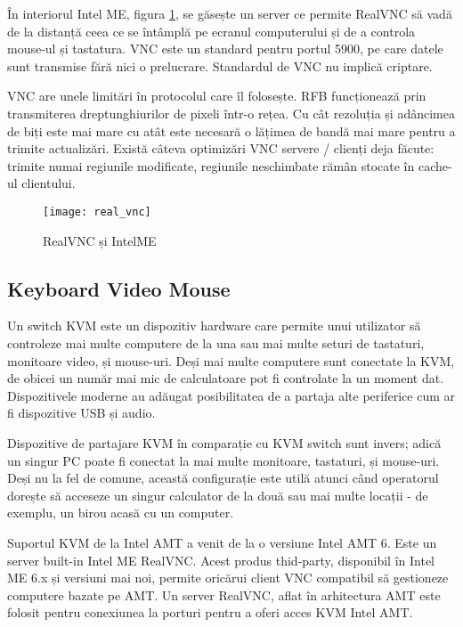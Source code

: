 În interiorul Intel ME, figura \ref{real-vnc}, se găsește un server ce permite RealVNC să vadă de la distanță ceea ce se întâmplă pe ecranul computerului și de a controla mouse-ul și tastatura. VNC este un standard pentru portul 5900, pe care datele sunt transmise fără nici o prelucrare. Standardul de VNC nu implică criptare. 

VNC are unele limitări în protocolul care îl folosește. RFB funcționează prin transmiterea dreptunghiurilor de pixeli într-o rețea. Cu cât rezoluția și adâncimea de biți este mai mare cu atât este necesară o lățimea de bandă mai mare pentru a trimite actualizări. Există câteva optimizări VNC servere / clienți deja făcute: trimite numai regiunile modificate, regiunile neschimbate rămân stocate în cache-ul clientului.

\begin{figure}
    \centering
    \texttt{[image: real\_vnc]}
    \caption{RealVNC și IntelME}
    \label{real-vnc}
\end{figure}

\subsection{Keyboard Video Mouse}

Un switch KVM este un dispozitiv hardware care permite unui utilizator să controleze mai multe computere de la una sau mai multe seturi de tastaturi, monitoare video, și mouse-uri. Deși mai multe computere sunt conectate la KVM, de obicei un număr mai mic de calculatoare pot fi controlate la un moment dat. Dispozitivele moderne au adăugat posibilitatea de a partaja alte periferice cum ar fi dispozitive USB și audio.

Dispozitive de partajare KVM în comparație cu KVM switch sunt invers; adică un singur PC poate fi conectat la mai multe monitoare, tastaturi, și mouse-uri. Deși nu la fel de comune, această configurație este utilă atunci când operatorul dorește să acceseze un singur calculator de la două sau mai multe locații - de exemplu, un birou acasă cu un computer.

Suportul KVM de la Intel AMT a venit de la o versiune Intel AMT 6. Este un server built-in Intel ME RealVNC. Acest produs thid-party, disponibil în Intel ME 6.x și versiuni mai noi, permite oricărui client VNC compatibil să gestioneze computere bazate pe AMT. Un server RealVNC, aflat în arhitectura AMT este folosit pentru conexiunea la porturi pentru a oferi acces KVM Intel AMT.

